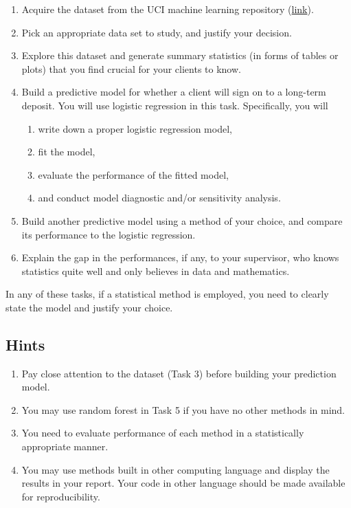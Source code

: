 \documentclass[12pt,]{book}
\providecommand{\tightlist}{%
  \setlength{\itemsep}{0pt}\setlength{\parskip}{0pt}}
\begin{document}
\begin{enumerate}
\def\labelenumi{\arabic{enumi}.}
\tightlist
\item
  Acquire the dataset from the UCI machine learning repository
  (\href{https://archive.ics.uci.edu/ml/datasets/Bank+Marketing\#}{link}).
\item
  Pick an appropriate data set to study, and justify your decision.
\item
  Explore this dataset and generate summary statistics (in forms of
  tables or plots) that you find crucial for your clients to know.
\item
  Build a predictive model for whether a client will sign on to a
  long-term deposit. You will use logistic regression in this task.
  Specifically, you will

  \begin{enumerate}
  \def\labelenumii{\alph{enumii}.}
  \tightlist
  \item
    write down a proper logistic regression model,
  \item
    fit the model,
  \item
    evaluate the performance of the fitted model,
  \item
    and conduct model diagnostic and/or sensitivity analysis.
  \end{enumerate}
\item
  Build another predictive model using a method of your choice, and
  compare its performance to the logistic regression.
\item
  Explain the gap in the performances, if any, to your supervisor, who
  knows statistics quite well and only believes in data and mathematics.
\end{enumerate}

In any of these tasks, if a statistical method is employed, you need to
clearly state the model and justify your choice.

\subsection{Hints}\label{hints-1}

\begin{enumerate}
\def\labelenumi{\arabic{enumi}.}
\tightlist
\item
  Pay close attention to the dataset (Task 3) before building your
  prediction model.
\item
  You may use random forest in Task 5 if you have no other methods in
  mind.
\item
  You need to evaluate performance of each method in a statistically
  appropriate manner.
\item
  You may use methods built in other computing language and display the
  results in your report. Your code in other language should be made
  available for reproducibility.
\end{enumerate}


\end{document}
